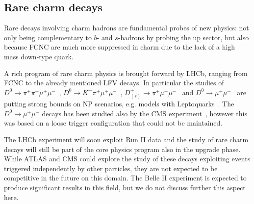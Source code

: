 \subsection{Rare charm decays}

Rare decays involving charm hadrons are fundamental probes of new physics: 
not only being complementary to $b$- and $s$-hadrons by probing the up sector, 
but also because FCNC are much more suppressed in charm due to the lack of a high mass down-type quark. 

A rich program of rare charm physics is brought forward by LHCb, ranging from FCNC to the already mentioned LFV decays. 
In particular the studies of $D^0\to \pi^+ \pi^- \mu^+\mu^-$~\cite{Aaij:2013uoa}, 
$D^0\to K^- \pi^+ \mu^+\mu^-$~\cite{Aaij:2015hva}, $D^+_{(s)}\to \pi^+ \mu^+\mu^-$~\cite{Aaij:2013sua} and $D^0\to \mu^+\mu^-$~\cite{Aaij:2013cza}
are putting strong bounds on NP scenarios, e.g. models with Leptoquarks~\cite{Bauer:2015knc}.
The $D^0 \to \mu^+ \mu^-$ decays has been studied also by the CMS experiment~\cite{Pedrini:2012vp}, however this was based on a loose trigger
configuration that could not be maintained.

The LHCb experiment will soon exploit Run II data and the study of rare charm decays will still be part of the core physics program
also in the upgrade phase. 
While ATLAS and CMS could explore the study of these decays exploiting events triggered independently by other particles, they are not expected to 
be competitive in the future on this domain. 
The Belle II experiment is expected to produce significant results in this field, but we do not discuss further this aspect here. 

